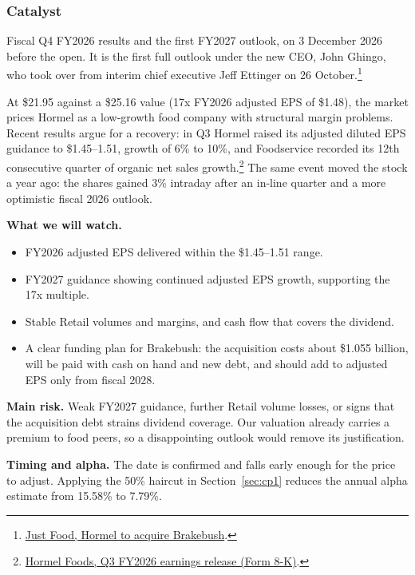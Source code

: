 \documentclass[10pt,a4paper]{article}
\begin{document}
\subsubsection*{Catalyst}
Fiscal Q4 FY2026 results and the first FY2027 outlook, on 3 December 2026 before the open. It is the first full outlook under the new CEO, John Ghingo, who took over from interim chief executive Jeff Ettinger on 26 October.\footnote{\href{https://www.just-food.com/?p=213435}{Just Food, Hormel to acquire Brakebush}.}

At \$21.95 against a \$25.16 value (17x FY2026 adjusted EPS of \$1.48), the market prices Hormel as a low-growth food company with structural margin problems. Recent results argue for a recovery: in Q3 Hormel raised its adjusted diluted EPS guidance to \$1.45--1.51, growth of 6\% to 10\%, and Foodservice recorded its 12th consecutive quarter of organic net sales growth.\footnote{\href{https://www.sec.gov/Archives/edgar/data/0000048465/000004846526000053/hormelearningsreleaseq32026.htm}{Hormel Foods, Q3 FY2026 earnings release (Form 8-K)}.} The same event moved the stock a year ago: the shares gained 3\% intraday after an in-line quarter and a more optimistic fiscal 2026 outlook.

\textbf{What we will watch.}
\begin{itemize}[leftmargin=1.2em,itemsep=2pt,topsep=2pt]
  \item FY2026 adjusted EPS delivered within the \$1.45--1.51 range.
  \item FY2027 guidance showing continued adjusted EPS growth, supporting the 17x multiple.
  \item Stable Retail volumes and margins, and cash flow that covers the dividend.
  \item A clear funding plan for Brakebush: the acquisition costs about \$1.055 billion, will be paid with cash on hand and new debt, and should add to adjusted EPS only from fiscal 2028.
\end{itemize}

\textbf{Main risk.} Weak FY2027 guidance, further Retail volume losses, or signs that the acquisition debt strains dividend coverage. Our valuation already carries a premium to food peers, so a disappointing outlook would remove its justification.

\textbf{Timing and alpha.} The date is confirmed and falls early enough for the price to adjust. Applying the 50\% haircut in Section~\ref{sec:cp1} reduces the annual alpha estimate from 15.58\% to 7.79\%.
\end{document}
